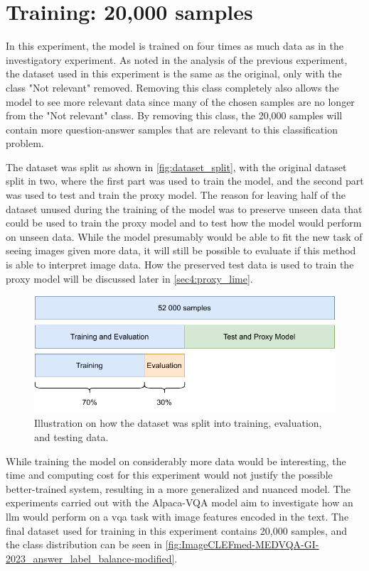     \section{Training: 20,000 samples}

    In this experiment, the model is trained on four times as much data as in the investigatory experiment. 
    As noted in the analysis of the previous experiment, the dataset used in this experiment is the same as the original, only with the class "Not relevant" removed.
    Removing this class completely also allows the model to see more relevant data since many of the chosen samples are no longer from the "Not relevant" class. 
    By removing this class, the 20,000 samples will contain more question-answer samples that are relevant to this classification problem. 
    
    The dataset was split as shown in \autoref{fig:dataset_split}, with the original dataset split in two, where the first part was used to train the model, and the second part was used to test and train the proxy model. The reason for leaving half of the dataset unused during the training of the model was to preserve unseen data that could be used to train the proxy model and to test how the model would perform on unseen data. While the model presumably would be able to fit the new task of seeing images given more data, it will still be possible to evaluate if this method is able to interpret image data. How the preserved test data is used to train the proxy model will be discussed later in \autoref{sec4:proxy_lime}.


    \begin{figure}[htb]
        \centerline{
        \includegraphics[width=\textwidth]{images/datatset_split.pdf}}
        \caption{Illustration on how the dataset was split into training, evaluation, and testing data.}
        \label{fig:dataset_split}
    \end{figure} 
    
    While training the model on considerably more data would be interesting, the time and computing cost for this experiment would not justify the possible better-trained system, resulting in a more generalized and nuanced model. The experiments carried out with the Alpaca-VQA model aim to investigate how an \gls{llm} would perform on a \gls{vqa} task with image features encoded in the text.
    The final dataset used for training in this experiment contains 20,000 samples, and the class distribution can be seen in \autoref{fig:ImageCLEFmed-MEDVQA-GI-2023_answer_label_balance-modified}.


